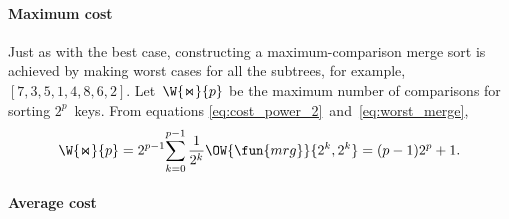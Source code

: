 \paragraph{Maximum cost}

Just as with the best case, constructing a maximum\hyp{}comparison
merge sort is achieved by making worst cases for all the subtrees, for
example, \([7,3,5,1,4,8,6,2]\). Let~\(\W{\Join}{p}\) be the maximum
number of comparisons for sorting \(2^p\)~keys. From equations
\eqref{eq:cost_power_2}~and~\eqref{eq:worst_merge},
\begin{equation}
\W{\Join}{p}
  = 2^{p-1}\!\sum_{k=0}^{p-1}{\frac{1}{2^k}\OW{\fun{mrg}}{2^k,2^k}}
  = (p-1)2^p + 1.
\label{eq:worst_power}\index{mrg@$\W{\Join}{n}$}
\end{equation}

\paragraph{Average cost}
\label{par:Atms_2p}

